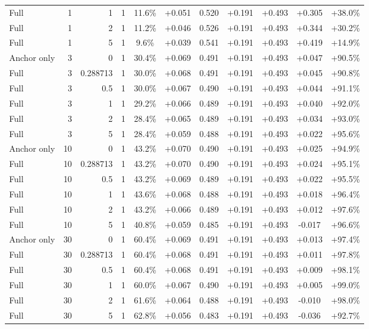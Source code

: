 \begin{table}[htbp]
\begin{tabular}{lrrrccccccc}
Full & 1 & 1 & 1 & 11.6\% & +0.051 & 0.520 & +0.191 & +0.493 & +0.305 & +38.0\% \\
Full & 1 & 2 & 1 & 11.2\% & +0.046 & 0.526 & +0.191 & +0.493 & +0.344 & +30.2\% \\
Full & 1 & 5 & 1 & 9.6\% & +0.039 & 0.541 & +0.191 & +0.493 & +0.419 & +14.9\% \\
Anchor only & 3 & 0 & 1 & 30.4\% & +0.069 & 0.491 & +0.191 & +0.493 & +0.047 & +90.5\% \\
Full & 3 & 0.288713 & 1 & 30.0\% & +0.068 & 0.491 & +0.191 & +0.493 & +0.045 & +90.8\% \\
Full & 3 & 0.5 & 1 & 30.0\% & +0.067 & 0.490 & +0.191 & +0.493 & +0.044 & +91.1\% \\
Full & 3 & 1 & 1 & 29.2\% & +0.066 & 0.489 & +0.191 & +0.493 & +0.040 & +92.0\% \\
Full & 3 & 2 & 1 & 28.4\% & +0.065 & 0.489 & +0.191 & +0.493 & +0.034 & +93.0\% \\
Full & 3 & 5 & 1 & 28.4\% & +0.059 & 0.488 & +0.191 & +0.493 & +0.022 & +95.6\% \\
Anchor only & 10 & 0 & 1 & 43.2\% & +0.070 & 0.490 & +0.191 & +0.493 & +0.025 & +94.9\% \\
Full & 10 & 0.288713 & 1 & 43.2\% & +0.070 & 0.490 & +0.191 & +0.493 & +0.024 & +95.1\% \\
Full & 10 & 0.5 & 1 & 43.2\% & +0.069 & 0.489 & +0.191 & +0.493 & +0.022 & +95.5\% \\
Full & 10 & 1 & 1 & 43.6\% & +0.068 & 0.488 & +0.191 & +0.493 & +0.018 & +96.4\% \\
Full & 10 & 2 & 1 & 43.2\% & +0.066 & 0.489 & +0.191 & +0.493 & +0.012 & +97.6\% \\
Full & 10 & 5 & 1 & 40.8\% & +0.059 & 0.485 & +0.191 & +0.493 & -0.017 & +96.6\% \\
Anchor only & 30 & 0 & 1 & 60.4\% & +0.069 & 0.491 & +0.191 & +0.493 & +0.013 & +97.4\% \\
Full & 30 & 0.288713 & 1 & 60.4\% & +0.068 & 0.491 & +0.191 & +0.493 & +0.011 & +97.8\% \\
Full & 30 & 0.5 & 1 & 60.4\% & +0.068 & 0.491 & +0.191 & +0.493 & +0.009 & +98.1\% \\
Full & 30 & 1 & 1 & 60.0\% & +0.067 & 0.490 & +0.191 & +0.493 & +0.005 & +99.0\% \\
Full & 30 & 2 & 1 & 61.6\% & +0.064 & 0.488 & +0.191 & +0.493 & -0.010 & +98.0\% \\
Full & 30 & 5 & 1 & 62.8\% & +0.056 & 0.483 & +0.191 & +0.493 & -0.036 & +92.7\% \\

\end{tabular}
\end{table}
